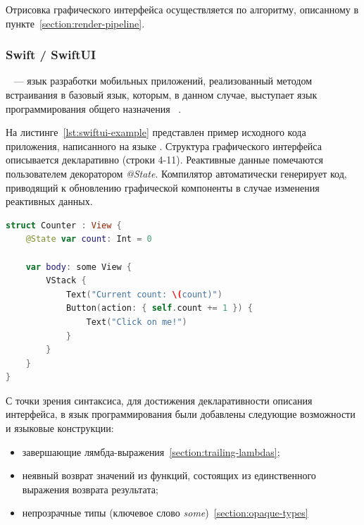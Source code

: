 Отрисовка графического интерфейса осуществляется по алгоритму, описанному в пункте~\ref{section:render-pipeline}.

\subsubsection*{Swift / SwiftUI}
~\cite{swiftui-homepage} --- язык разработки мобильных
приложений, реализованный методом встраивания в базовый
язык, которым, в данном случае, выступает язык программирования общего
назначения ~\cite{swift-homepage}.

На листинге~\ref{lst:swiftui-example} представлен пример исходного кода
приложения, написанного на языке .
Структура графического интерфейса описывается декларативно (строки 4-11). Реактивные данные помечаются пользователем декоратором \textit{@State}. Компилятор автоматически генерирует код, приводящий к обновлению графической компоненты в случае изменения реактивных данных.
\begin{lstlisting}[language=Swift,caption=Счётчик нажатия кнопки на языке
\name{Swift/SwiftUI},label={lst:swiftui-example}]
struct Counter : View {
    @State var count: Int = 0
	
    var body: some View {
        VStack {
            Text("Current count: \(count)")
            Button(action: { self.count += 1 }) {
                Text("Click on me!")
            }
        }
    }
}
\end{lstlisting}

С точки зрения синтаксиса, для достижения декларативности описания
интерфейса, в язык программирования  были добавлены следующие
возможности и языковые конструкции:
\begin{itemize}
	\item завершающие лямбда-выражения~\ref{section:trailing-lambdas};
	\item неявный возврат значений из функций, состоящих из единственного
	выражения возврата результата;
	\item непрозрачные типы
	(ключевое слово \textit{some})~\ref{section:opaque-types}
\end{itemize}

